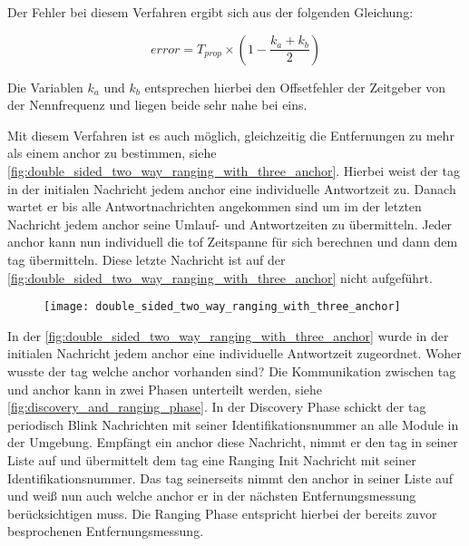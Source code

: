 Der Fehler bei diesem Verfahren ergibt sich aus der folgenden Gleichung:

\begin{equation}
error=T_{prop}\times\left(1-\frac{k_a+k_b}{2}\right)
\end{equation}

Die Variablen $k_a$ und $k_b$ entsprechen hierbei den Offsetfehler der Zeitgeber von der Nennfrequenz und liegen beide sehr nahe bei eins.

Mit diesem Verfahren ist es auch möglich, gleichzeitig die Entfernungen zu mehr als einem \Gls{anchor} zu bestimmen, siehe \autoref{fig:double_sided_two_way_ranging_with_three_anchor}. Hierbei weist der \Gls{tag} in der initialen Nachricht jedem \Gls{anchor} eine individuelle Antwortzeit zu. Danach wartet er bis alle Antwortnachrichten angekommen sind um im der letzten Nachricht jedem \Gls{anchor} seine Umlauf- und Antwortzeiten zu übermitteln. Jeder \Gls{anchor} kann nun individuell die \Gls{tof} Zeitspanne für sich berechnen und dann dem \Gls{tag} übermitteln. Diese letzte Nachricht ist auf der \autoref{fig:double_sided_two_way_ranging_with_three_anchor} nicht aufgeführt.

\begin{figure}
	\centering
	\texttt{[image: double\_sided\_two\_way\_ranging\_with\_three\_anchor]}
	\label{fig:double_sided_two_way_ranging_with_three_anchor}
\end{figure}

In der \autoref{fig:double_sided_two_way_ranging_with_three_anchor} wurde in der initialen Nachricht jedem \Gls{anchor} eine individuelle Antwortzeit zugeordnet. Woher wusste der \Gls{tag} welche \Gls{anchor} vorhanden sind? Die Kommunikation zwischen \Gls{tag} und \Gls{anchor} kann in zwei Phasen unterteilt werden, siehe \autoref{fig:discovery_and_ranging_phase}. In der Discovery Phase schickt der \Gls{tag} periodisch Blink Nachrichten mit seiner \mbox{Identifikationsnummer} an alle Module in der Umgebung. Empfängt ein \Gls{anchor} diese Nachricht, nimmt er den \Gls{tag} in seiner Liste auf und übermittelt dem \Gls{tag} eine Ranging Init Nachricht mit seiner Identifikationsnummer. Das \Gls{tag} seinerseits nimmt den \Gls{anchor} in seiner Liste auf und weiß nun auch welche \Gls{anchor} er in der nächsten Entfernungsmessung berücksichtigen muss. Die Ranging Phase entspricht hierbei der bereits zuvor besprochenen Entfernungsmessung.


